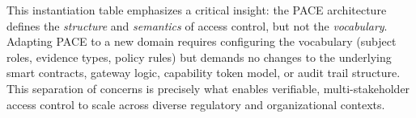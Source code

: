 \documentclass[pdflatex,sn-mathphys-num]{sn-jnl}
\begin{document}



This instantiation table emphasizes a critical insight: the PACE architecture defines the \emph{structure} and \emph{semantics} of access control, but not the \emph{vocabulary}. Adapting PACE to a new domain requires configuring the vocabulary (subject roles, evidence types, policy rules) but demands no changes to the underlying smart contracts, gateway logic, capability token model, or audit trail structure. This separation of concerns is precisely what enables verifiable, multi-stakeholder access control to scale across diverse regulatory and organizational contexts.
\end{document}
